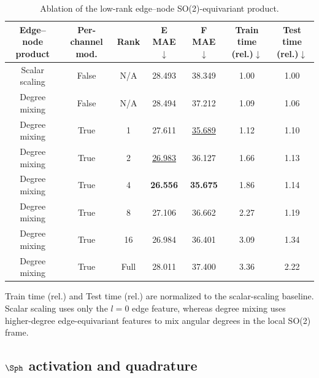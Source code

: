 \begin{table}[ht]
    \centering
    \scriptsize
    \begin{threeparttable}
        \caption{Ablation of the low-rank edge--node SO(2)-equivariant product.}
        \label{tab:dpa4_radial_degree_ablation}
        \begin{tabular*}{\linewidth}{@{\extracolsep{\fill}}ccccccc@{}}
            \toprule
            \textbf{Edge--node product} &
            \textbf{Per-channel mod.} &
            \textbf{Rank} &
            \textbf{E MAE}$\downarrow$ &
            \textbf{F MAE}$\downarrow$ &
            \textbf{Train time (rel.)}$\downarrow$ &
            \textbf{Test time (rel.)}$\downarrow$ \\
            \midrule
            Scalar scaling & False & N/A & 28.493 & 38.349 & 1.00 & 1.00 \\
            Degree mixing & False & N/A & 28.494 & 37.212 & 1.09 & 1.06 \\
            Degree mixing & True & 1 & 27.611 & \underline{35.689} & 1.12 & 1.10 \\
            Degree mixing & True & 2 & \underline{26.983} & 36.127 & 1.66 & 1.13 \\
            Degree mixing & True & 4 & \textbf{26.556} & \textbf{35.675} & 1.86 & 1.14 \\
            Degree mixing & True & 8 & 27.106 & 36.662 & 2.27 & 1.19 \\
            Degree mixing & True & 16 & 26.984 & 36.401 & 3.09 & 1.34 \\
            Degree mixing & True & Full & 28.011 & 37.400 & 3.36 & 2.22 \\
            \bottomrule
        \end{tabular*}
        \begin{tablenotes}
            \item[a] Train time (rel.) and Test time (rel.) are normalized to the scalar-scaling
            baseline. Scalar scaling uses only the $l=0$ edge feature, whereas degree
            mixing uses higher-degree edge-equivariant features to mix angular degrees in the local
            SO(2) frame.
        \end{tablenotes}
    \end{threeparttable}
\end{table}

\FloatBarrier

\subsection{\texorpdfstring{$\Sph$}{S2} activation and quadrature}

